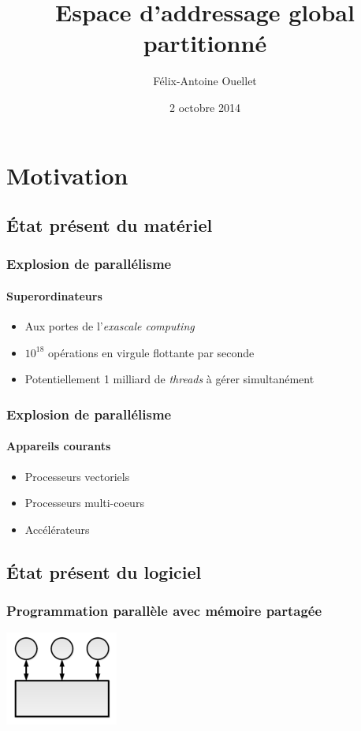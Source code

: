 \documentclass{beamer}
\author[Félix-Antoine Ouellet]{Félix-Antoine Ouellet}
\title[PGAS\hspace{2em}\insertframenumber/\inserttotalframenumber]{Espace d'addressage global partitionné}
\institute{Université de Sherbrooke}
\date{2 octobre 2014}
\begin{document}
\begin{frame}
\titlepage %
\end{frame}

\begin{frame}
\tableofcontents[hideallsubsections]
\end{frame}

\section{Motivation}
\subsection{État présent du matériel}
\begin{frame}
\frametitle{Explosion de parallélisme}
\framesubtitle{Superordinateurs}
\begin{itemize}
\item Aux portes de l'\textit{exascale computing}
\item $10^{18}$ opérations en virgule flottante par seconde
\item Potentiellement 1 milliard de \textit{threads} à gérer simultanément
\end{itemize}
\end{frame}

\begin{frame}
\frametitle{Explosion de parallélisme}
\framesubtitle{Appareils courants}
\begin{itemize}
\item Processeurs vectoriels
\item Processeurs multi-coeurs
\item Accélérateurs
\end{itemize}
\end{frame}

\subsection{État présent du logiciel}
\begin{frame}
\frametitle{Programmation parallèle avec mémoire partagée}
\begin{center}
\includegraphics[scale=3]{shared.png}
\end{center}
\end{frame}
\end{document}
